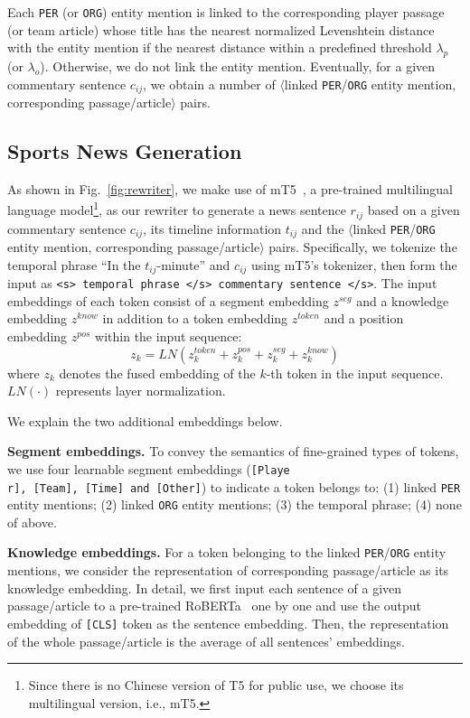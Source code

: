 Each \texttt{PER} (or \texttt{ORG}) entity mention is linked to the corresponding player passage (or team article) whose title has the nearest normalized Levenshtein distance with the entity mention if the nearest distance within a predefined threshold $\lambda_{p}$ (or $\lambda_{o}$). Otherwise, we do not link the entity mention.
Eventually, for a given commentary sentence $c_{ij}$, we obtain a number of $\langle$linked \texttt{PER}/\texttt{ORG} entity mention, corresponding passage/article$\rangle$ pairs.

\subsection{Sports News Generation}
\label{sec:rewriter}
As shown in Fig.~\ref{fig:rewriter}, we make use of mT5~\cite{Xue2021mT5AM}, a pre-trained multilingual language model\footnote{Since there is no Chinese version of T5 for public use, we choose its multilingual version, i.e., mT5.}, as our rewriter to generate a news sentence $r_{ij}$ based on a given commentary sentence $c_{ij}$, its timeline information $t_{ij}$ and the $\langle$linked \texttt{PER}/\texttt{ORG} entity mention, corresponding passage/article$\rangle$ pairs.
Specifically, we tokenize the temporal phrase ``In the $t_{ij}$-minute'' and $c_{ij}$ using mT5's tokenizer, then form the input as \texttt{<s> temporal phrase </s> commentary sentence </s>}. The input embeddings of each token consist of a segment embedding $z^{seg}$ and a knowledge embedding $z^{know}$ in addition to a token embedding $z^{token}$ and a position embedding $z^{pos}$ within the input sequence:
\begin{equation}
\label{equa:input_embedding}
z_{k} = LN(z_{k}^{token}+z_{k}^{pos}+z_{k}^{seg}+z_{k}^{know})
\end{equation}
where $z_{k}$ denotes the fused embedding of the $k$-th token in the input sequence. $LN(\cdot)$ represents layer normalization.

We explain the two additional embeddings below.

\noindent\textbf{Segment embeddings.} To convey the semantics of fine-grained types of tokens, we use four learnable segment embeddings (\texttt{[Playe\\r], [Team], [Time] and [Other]}) to indicate a token belongs to: (1) linked \texttt{PER} entity mentions; (2) linked \texttt{ORG} entity mentions; (3) the temporal phrase; (4) none of above.

\noindent\textbf{Knowledge embeddings.} For a token belonging to the linked \texttt{PER}/\texttt{ORG} entity mentions, we consider the representation of corresponding passage/article as its knowledge embedding. In detail, we first input each sentence of a given passage/article to a pre-trained RoBERTa~\cite{Liu2019RoBERTaAR} one by one and use the output embedding of \texttt{[CLS]} token as the sentence embedding. Then, the representation of the whole passage/article is the average of all sentences' embeddings.

